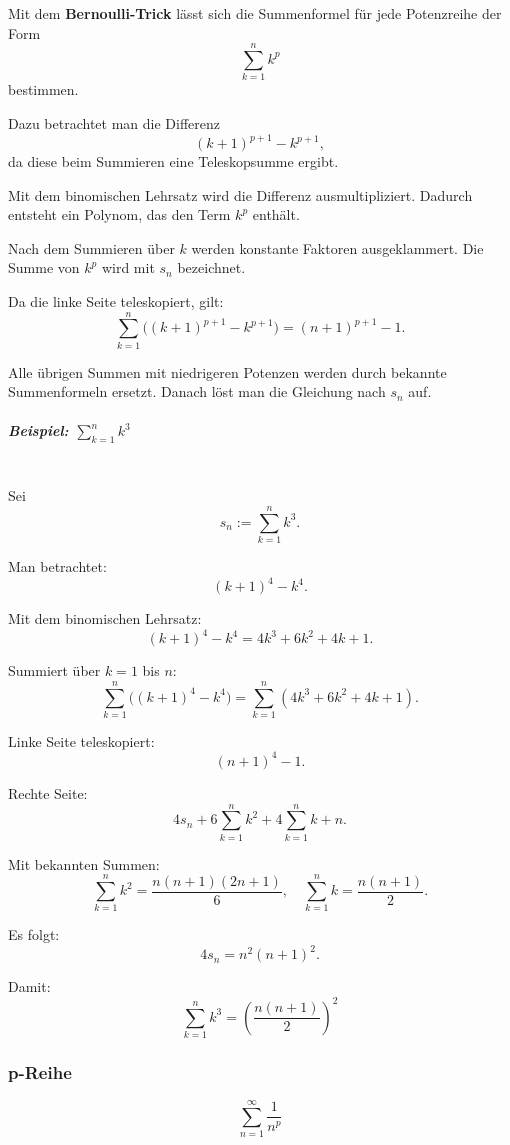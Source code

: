     Mit dem \textbf{Bernoulli-Trick} lässt sich die Summenformel für jede Potenzreihe der Form
    \[
    \sum_{k=1}^n k^p
    \]
    bestimmen.
    
    Dazu betrachtet man die Differenz
    \[
    (k+1)^{p+1} - k^{p+1},
    \]
    da diese beim Summieren eine Teleskopsumme ergibt.
    
    Mit dem binomischen Lehrsatz wird die Differenz ausmultipliziert. Dadurch entsteht ein Polynom, das den Term \(k^p\) enthält.
    
    Nach dem Summieren über \(k\) werden konstante Faktoren ausgeklammert. Die Summe von \(k^p\) wird mit \(s_n\) bezeichnet.
    
    Da die linke Seite teleskopiert, gilt:
    \[
    \sum_{k=1}^n \big((k+1)^{p+1} - k^{p+1}\big) = (n+1)^{p+1}-1.
    \]
    
    Alle übrigen Summen mit niedrigeren Potenzen werden durch bekannte Summenformeln ersetzt. Danach löst man die Gleichung nach \(s_n\) auf.
    
    \subparagraph{Beispiel: \(\sum_{k=1}^n k^3\)}\mbox{}\\
    
    Sei
    \[
    s_n := \sum_{k=1}^n k^3.
    \]
    
    Man betrachtet:
    \[
    (k+1)^4 - k^4.
    \]
    
    Mit dem binomischen Lehrsatz:
    \[
    (k+1)^4 - k^4 = 4k^3 + 6k^2 + 4k + 1.
    \]
    
    Summiert über \(k=1\) bis \(n\):
    \[
    \sum_{k=1}^n \big((k+1)^4 - k^4\big)
    =
    \sum_{k=1}^n (4k^3 + 6k^2 + 4k + 1).
    \]
    
    Linke Seite teleskopiert:
    \[
    (n+1)^4 - 1.
    \]
    
    Rechte Seite:
    \[
    4s_n
    + 6\sum_{k=1}^n k^2
    + 4\sum_{k=1}^n k
    + n.
    \]
    
    Mit bekannten Summen:
    \[
    \sum_{k=1}^n k^2 = \frac{n(n+1)(2n+1)}{6}, \quad
    \sum_{k=1}^n k = \frac{n(n+1)}{2}.
    \]
    
    Es folgt:
    \[
    4s_n = n^2(n+1)^2.
    \]
    
    Damit:
    \[
    \boxed{
        \sum_{k=1}^n k^3 = \left(\frac{n(n+1)}{2}\right)^2
    }
    \]
    
    \subsubsection{p-Reihe}
    \[
    \sum_{n=1}^{\infty} \frac{1}{n^p}
    \]
    
